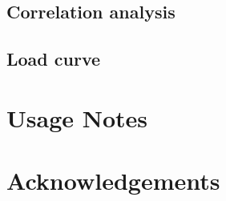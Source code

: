 \documentclass[12pt]{article}
\begin{document}
\subsection*{Correlation analysis}
\subsection*{Load curve}


\section*{Usage Notes}

\section*{Acknowledgements}

\newpage


\end{document}
